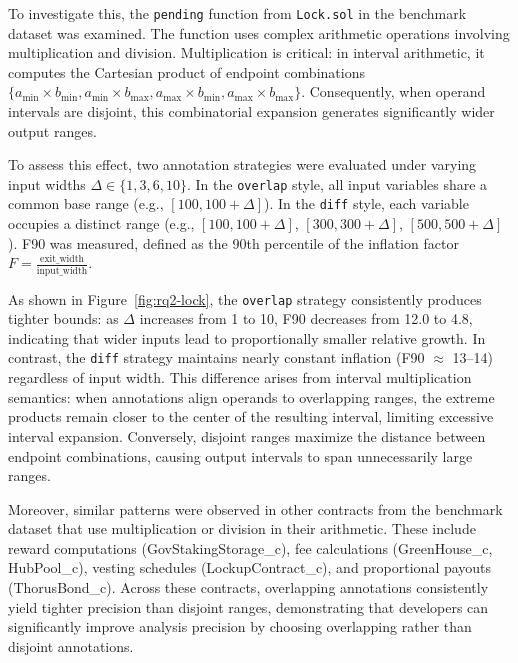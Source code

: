 \documentclass[pdflatex,sn-basic]{sn-jnl}%
\theoremstyle{thmstyleone}%
\theoremstyle{thmstyletwo}%
\theoremstyle{thmstylethree}%
\begin{document}
To investigate this, the \texttt{pending} function from \texttt{Lock.sol} in the benchmark dataset was examined.
The function uses complex arithmetic operations involving multiplication and division.
Multiplication is critical: in interval arithmetic,
it computes the Cartesian product of endpoint combinations $\{a_{\min} \times b_{\min}, a_{\min} \times b_{\max}, a_{\max} \times b_{\min}, a_{\max} \times b_{\max}\}$.
Consequently, when operand intervals are disjoint, this combinatorial expansion generates significantly wider output ranges.

To assess this effect, two annotation strategies were evaluated under varying input widths $\Delta \in \{1, 3, 6, 10\}$.
In the \texttt{overlap} style, all input variables share a common base range (e.g., $[100, 100+\Delta]$).
In the \texttt{diff} style, each variable occupies a distinct range (e.g., $[100, 100+\Delta]$, $[300, 300+\Delta]$,
$[500, 500+\Delta]$). F90 was measured, defined as the 90th percentile of the inflation factor
$F = \frac{\text{exit\_width}}{\text{input\_width}}$.

As shown in Figure~\ref{fig:rq2-lock}, the \texttt{overlap} strategy consistently produces tighter bounds: as $\Delta$ increases from 1 to 10,
F90 decreases from 12.0 to 4.8, indicating that wider inputs lead to proportionally smaller relative growth.
In contrast, the \texttt{diff} strategy maintains nearly constant inflation (F90 $\approx$ 13--14) regardless of input width.
This difference arises from interval multiplication semantics: when annotations align operands to overlapping ranges,
the extreme products remain closer to the center of the resulting interval, limiting excessive interval expansion.
Conversely, disjoint ranges maximize the distance between endpoint combinations, causing output intervals to span unnecessarily large ranges.

Moreover, similar patterns were observed in other contracts from the benchmark dataset that use multiplication or division in their arithmetic.
These include reward computations (GovStakingStorage\_c), fee calculations (GreenHouse\_c, HubPool\_c), vesting schedules (LockupContract\_c), and proportional payouts (ThorusBond\_c).
Across these contracts, overlapping annotations consistently yield tighter precision than disjoint ranges,
demonstrating that developers can significantly improve analysis precision by choosing overlapping rather than disjoint annotations.

\medskip
\noindent{}
\end{document}
